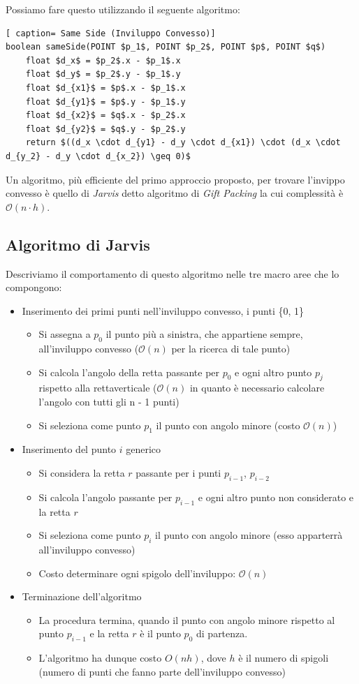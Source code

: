\documentclass[../cheatSheetAlgoritmi.tex]{subfiles}
\begin{document}
Possiamo fare questo utilizzando il seguente algoritmo:
 \begin{lstlisting}[ caption= Same Side (Inviluppo Convesso)]
boolean sameSide(POINT $p_1$, POINT $p_2$, POINT $p$, POINT $q$)
	float $d_x$ = $p_2$.x - $p_1$.x
	float $d_y$ = $p_2$.y - $p_1$.y
	float $d_{x1}$ = $p$.x - $p_1$.x
	float $d_{y1}$ = $p$.y - $p_1$.y
	float $d_{x2}$ = $q$.x - $p_2$.x
	float $d_{y2}$ = $q$.y - $p_2$.y
	return $((d_x \cdot d_{y1} - d_y \cdot d_{x1}) \cdot (d_x \cdot d_{y_2} - d_y \cdot d_{x_2}) \geq 0)$
\end{lstlisting}
Un algoritmo, più efficiente del primo approccio proposto, per trovare l'invippo convesso è quello di \emph{Jarvis} detto algoritmo di \emph{Gift Packing} la cui complessità è $\mathcal{O}(n \cdot h)$.
\subsection{Algoritmo di Jarvis}
Descriviamo il comportamento di questo algoritmo nelle tre macro aree che lo compongono:
\begin{itemize}
\item Inserimento dei primi punti nell'inviluppo convesso, i punti \{0, 1\}
	\begin{itemize}
		\item Si assegna a $p_0$ il punto più a sinistra, che appartiene sempre, all'inviluppo convesso ($\mathcal{O}(n)$ per la ricerca di tale punto)
		\item Si calcola l'angolo della retta passante per $p_0$ e ogni altro punto $p_{j}$ rispetto alla rettaverticale ($\mathcal{O}(n)$ in quanto è necessario calcolare l'angolo con tutti gli n - 1 punti)
		\item Si seleziona come punto $p_1$ il punto con angolo minore (costo $\mathcal{O}(n)$)
	\end{itemize}
\item Inserimento del punto $i$ generico
	\begin{itemize}
		\item Si considera la retta $r$ passante per i punti $p_{i - 1}$, $p_{i - 2}$
		\item Si calcola l'angolo passante per $p_{i - 1}$ e ogni altro punto non considerato e la retta $r$
		\item Si seleziona come punto $p_i$ il punto con angolo minore (esso apparterrà all'inviluppo convesso)
		\item Costo determinare ogni spigolo dell'inviluppo: $\mathcal{O}(n)$
	\end{itemize}
\item Terminazione dell'algoritmo
	\begin{itemize}
		\item La procedura termina, quando il punto con angolo minore rispetto al punto $p_{i-1}$ e la retta $r$ è il punto $p_0$ di partenza.
		\item L'algoritmo ha dunque costo $O(nh)$, dove $h$ è il numero di spigoli (numero di punti che fanno parte dell'inviluppo convesso)
	\end{itemize}
\end{itemize} 
\end{document}
